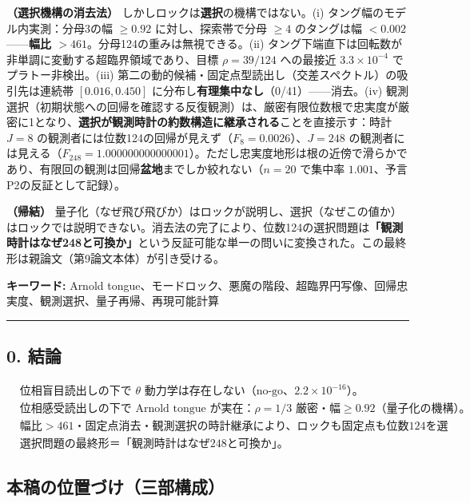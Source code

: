 \documentclass[
  a4paper,
]{ltjsarticle}
\begin{document}
\textbf{（選択機構の消去法）}
しかしロックは\textbf{選択}の機構ではない。(i)
タング幅のモデル内実測：分母3の幅 \(\ge0.92\) に対し、探索帯で分母
\(\ge4\) のタングは幅 \(<0.002\)------\textbf{幅比
\(>461\)}。分母124の重みは無視できる。(ii)
タング下端直下は回転数が非単調に変動する超臨界領域であり、目標
\(\rho=39/124\) への最接近 \(3.3\times10^{-4}\) でプラトー非検出。(iii)
第二の動的候補・固定点型読出し（交差スペクトル）の吸引先は連続帯
\([0.016,0.450]\) に分布し\textbf{有理集中なし}（0/41）------消去。(iv)
観測選択（初期状態への回帰を確認する反復観測）は、厳密有限位数根で忠実度が厳密に1となり、\textbf{選択が観測時計の約数構造に継承される}ことを直接示す：時計
\(J=8\) の観測者には位数124の回帰が見えず（\(F_8=0.0026\)）、\(J=248\)
の観測者には見える（\(F_{248}=1.000000000000001\)）。ただし忠実度地形は根の近傍で滑らかであり、有限回の観測は回帰\textbf{盆地}までしか絞れない（\(n=20\)
で集中率 \(1.001\)、予言P2の反証として記録）。

\textbf{（帰結）}
量子化（なぜ飛び飛びか）はロックが説明し、選択（なぜこの値か）はロックでは説明できない。消去法の完了により、位数124の選択問題は\textbf{「観測時計はなぜ248と可換か」}という反証可能な単一の問いに変換された。この最終形は親論文（第9論文本体）が引き受ける。

\textbf{キーワード:} Arnold
tongue、モードロック、悪魔の階段、超臨界円写像、回帰忠実度、観測選択、量子再帰、再現可能計算

\begin{center}\rule{0.5\linewidth}{0.5pt}\end{center}

\subsection{0. 結論}\label{ux7d50ux8ad6}

\[
\boxed{
\begin{aligned}
&\text{位相盲目読出しの下で }\theta\text{ 動力学は存在しない（no-go、}2.2\times10^{-16}\text{）。}\\
&\text{位相感受読出しの下で Arnold tongue が実在：}\rho=1/3\text{ 厳密・幅}\ge0.92\text{（量子化の機構）。}\\
&\text{幅比}>461\text{・固定点消去・観測選択の時計継承により、ロックも固定点も位数124を選択しない。}\\
&\text{選択問題の最終形＝「観測時計はなぜ248と可換か」。}
\end{aligned}
}
\]

\subsection{本稿の位置づけ（三部構成）}\label{ux672cux7a3fux306eux4f4dux7f6eux3065ux3051ux4e09ux90e8ux69cbux6210}
\end{document}
